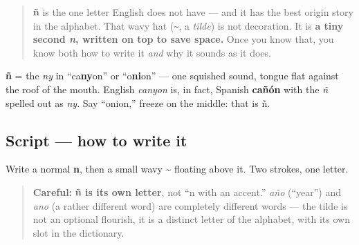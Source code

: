 \label{lesson:ES-W02-enye}



\begin{quote}
\textbf{ñ} is the one letter English does not have — and it has the best origin story in the alphabet. That wavy hat (\texttt{\textasciitilde{}}, a \emph{tilde}) is not decoration. It is \textbf{a tiny second \emph{n}, written on top to save space.} Once you know that, you know both how to write it \emph{and} why it sounds as it does.
\end{quote}

\begin{sounds}
\textbf{ñ} = the \emph{ny} in \textquotedblleft{}ca\textbf{ny}on\textquotedblright{} or \textquotedblleft{}o\textbf{ni}on\textquotedblright{} — one squished sound, tongue flat against the roof of the mouth. English \emph{canyon} is, in fact, Spanish \textbf{cañón} with the \emph{ñ} spelled out as \emph{ny}. Say \textquotedblleft{}onion,\textquotedblright{} freeze on the middle: that is ñ.
\end{sounds}

\subsection*{Script — how to write it}
Write a normal \textbf{n}, then a small wavy \textbf{\textasciitilde{}} floating above it. Two strokes, one letter.

\begin{quote}
\textbf{Careful:} \textbf{ñ is its own letter}, not \textquotedblleft{}n with an accent.\textquotedblright{} \emph{año} (\textquotedblleft{}year\textquotedblright{}) and \emph{ano} (a rather different word) are completely different words — the tilde is not an optional flourish, it is a distinct letter of the alphabet, with its own slot in the dictionary.
\end{quote}

